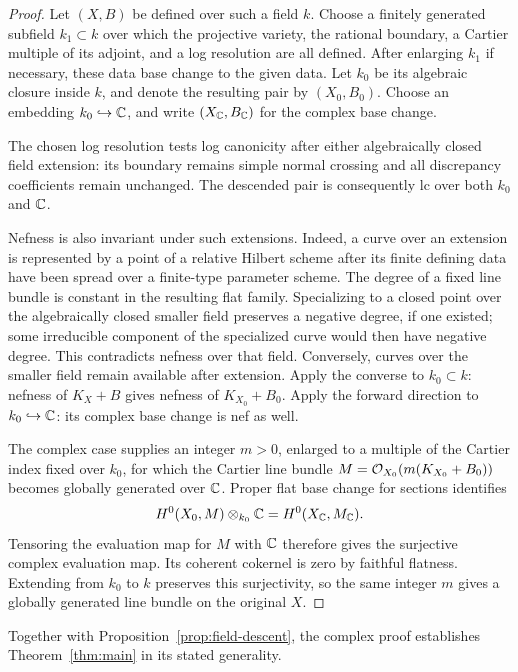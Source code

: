 \begin{proof}
Let \((X,B)\) be defined over such a field \(k\). Choose a finitely
generated subfield \(k_1\subset k\) over which the projective variety,
the rational boundary, a Cartier multiple of its adjoint, and a log
resolution are all defined. After enlarging \(k_1\) if necessary,
these data base change to the given data. Let \(k_0\) be its algebraic
closure inside \(k\), and denote the resulting pair by \((X_0,B_0)\).
Choose an embedding \(k_0\hookrightarrow\mathbb{C}\), and write
\((X_{\mathbb{C}},B_{\mathbb{C}})\) for the complex base change.

The chosen log resolution tests log canonicity after either
algebraically closed field extension: its boundary remains simple
normal crossing and all discrepancy coefficients remain unchanged.
The descended pair is consequently lc over both \(k_0\) and \(\mathbb{C}\).

Nefness is also invariant under such extensions. Indeed, a curve
over an extension is represented by a point of a relative Hilbert
scheme after its finite defining data have been spread over a
finite-type parameter scheme. The degree of a fixed line bundle is
constant in the resulting flat family. Specializing to a closed
point over the algebraically closed smaller field preserves a
negative degree, if one existed; some irreducible component of the
specialized curve would then have negative degree. This contradicts
nefness over that field. Conversely, curves over the smaller field
remain available after extension. Apply the converse to
\(k_0\subset k\): nefness of \(K_X+B\) gives nefness of
\(K_{X_0}+B_0\). Apply the forward direction to
\(k_0\hookrightarrow\mathbb{C}\): its complex base change is nef as well.

The complex case supplies an integer \(m>0\), enlarged to a multiple
of the Cartier index fixed over \(k_0\), for which the Cartier
line bundle \(M=\mathcal{O}_{X_0}(m(K_{X_0}+B_0))\) becomes
globally generated over \(\mathbb{C}\). Proper flat base change for sections
identifies
\[
 H^0(X_0,M)\otimes_{k_0}\mathbb{C}
   = H^0(X_{\mathbb{C}},M_{\mathbb{C}}).
\]
Tensoring the evaluation map for \(M\) with \(\mathbb{C}\) therefore gives
the surjective complex evaluation map. Its coherent cokernel is
zero by faithful flatness. Extending from \(k_0\) to \(k\) preserves
this surjectivity, so the same integer \(m\) gives a globally
generated line bundle on the original \(X\).
\end{proof}

Together with Proposition~\ref{prop:field-descent}, the complex proof
establishes Theorem~\ref{thm:main} in its stated generality.
